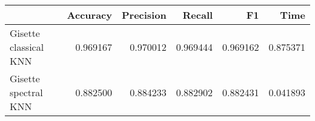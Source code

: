 \begin{tabular}{lrrrrr}
\toprule
{} &  Accuracy &  Precision &    Recall &        F1 &      Time \\
\midrule
Gisette classical KNN &  0.969167 &   0.970012 &  0.969444 &  0.969162 &  0.875371 \\
Gisette spectral KNN  &  0.882500 &   0.884233 &  0.882902 &  0.882431 &  0.041893 \\
\bottomrule
\end{tabular}
